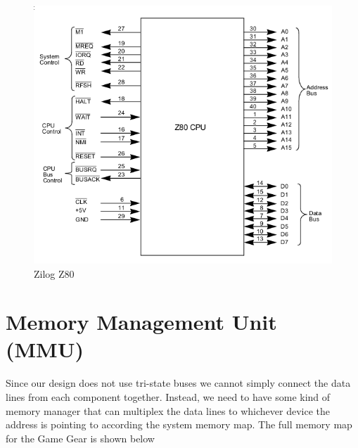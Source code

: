 \documentclass{article}
\begin{document}
\begin{figure}[H]
\centering
\includegraphics[scale=0.4]{z80.png}
\caption{Zilog Z80}
\label{fig:z80}
\end{figure}

\section{Memory Management Unit (MMU)}
Since our design does not use tri-state buses we cannot simply
connect the data lines from each component together. Instead, we
need to have some kind of memory manager that can multiplex the data
lines to whichever device the address is pointing to according the
system memory map. The full memory map for the Game Gear is shown below
\end{document}
